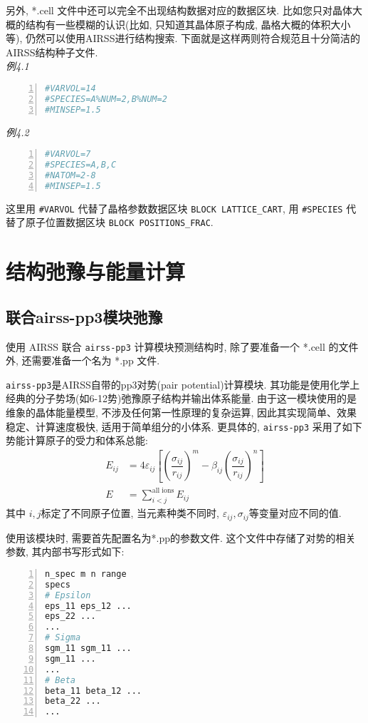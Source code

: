 \documentclass[a4paper, 10pt]{article}
\begin{document}
另外, *.cell 文件中还可以完全不出现结构数据对应的数据区块. 比如您只对晶体大概的结构有一些模糊的认识(比如, 只知道其晶体原子构成, 晶格大概的体积大小等), 仍然可以使用AIRSS进行结构搜索. 下面就是这样两则符合规范且十分简洁的AIRSS结构种子文件.\\
\emph{例4.1}
\begin{lstlisting}[language={bash},numbers=left]
#VARVOL=14
#SPECIES=A%NUM=2,B%NUM=2
#MINSEP=1.5
\end{lstlisting}
\emph{例4.2}
\begin{lstlisting}[language={bash},numbers=left]
#VARVOL=7
#SPECIES=A,B,C
#NATOM=2-8
#MINSEP=1.5        
\end{lstlisting}

这里用 \verb|#VARVOL| 代替了晶格参数数据区块 \verb|BLOCK LATTICE_CART|, 用 \verb|#SPECIES| 代替了原子位置数据区块 \verb|BLOCK POSITIONS_FRAC|.

\newpage
\section{结构弛豫与能量计算}

\subsection{联合airss-pp3模块弛豫}
使用 AIRSS 联合 \verb|airss-pp3| 计算模块预测结构时, 除了要准备一个 *.cell 的文件外, 还需要准备一个名为 *.pp 文件. 

 \verb|airss-pp3|是AIRSS自带的pp3对势(pair potential)计算模块. 其功能是使用化学上经典的分子势场(如6-12势)弛豫原子结构并输出体系能量. 由于这一模块使用的是维象的晶体能量模型, 不涉及任何第一性原理的复杂运算, 因此其实现简单、效果稳定、计算速度极快, 适用于简单组分的小体系. 更具体的, \verb|airss-pp3| 采用了如下势能计算原子的受力和体系总能:
\begin{subequations}
  \label{eq:pp3}
  \begin{align}
    E_{ij} &= 4\varepsilon_{ij}\left[\left(\dfrac{\sigma_{ij}}{r_{ij}}\right)^m -\beta_{ij}\left(\dfrac{\sigma_{ij}}{r_{ij}}\right)^n\right]\\
    E &= \sum_{i<j}^{\text{all ions}} E_{ij}
  \end{align}
\end{subequations}
其中 \(i,j\)标定了不同原子位置, 当元素种类不同时, \(\varepsilon_{ij},\sigma_{ij}\)等变量对应不同的值.

使用该模块时, 需要首先配置名为*.pp的参数文件. 这个文件中存储了对势的相关参数, 其内部书写形式如下: 
\begin{lstlisting}[language={bash},numbers=left]
n_spec m n range
specs
# Epsilon
eps_11 eps_12 ...
eps_22 ...
...
# Sigma
sgm_11 sgm_11 ... 
sgm_11 ... 
...
# Beta
beta_11 beta_12 ...
beta_22 ...
...
\end{lstlisting}
\end{document}
